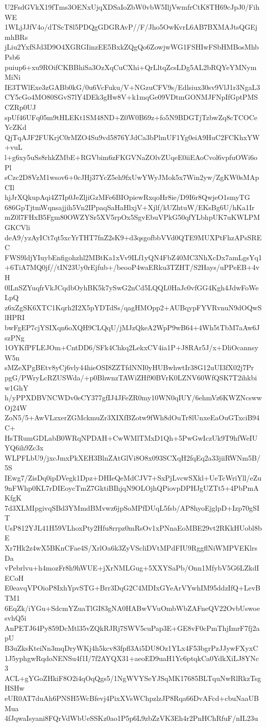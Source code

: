 U2FsdGVkX19fTms3OENxUjqXDSaIoZbW0vbW5IljVwmfrCtK8TH69cJpJ0/FihWE
1WLjJJfV4o/dTScT8l5PDQgGDGRAvP//F/Jho5OwKvrL6AB7BXMAJtsQGEjmhBRs
jLiu2YxfSJd3D9O4XGRGIinzEE5BxkZQgQo6ZowjwWG1FSHIwFSbHMBosMhbPsb6
puiup6+xu9ROifCKBBhiSa3OzXqCuCXhi+QrLltqZcsLDg5AL2bRQYeYMNymMiNi
IE3TWlExe3zGABb0kG/0u6VcFuku/V+NGzuCFV9s/Edlsiux30sv9VlJ1r3NgaL3
CY5cGo4MO80SGvS7lY4DEk3gHw8V+k1mqGe09VDtmGONMJFNpIfGptPMSCZRp0UJ
spUf46UFq05m9tHLEKt1SM48ND+Z0W0B69z+fo5N9BDGTjTzbwZq8cTCOCeYcZKd
QjTqAJF2FUKrjC0rMZO4Su9vd5876YJdCa3bPlmUF1Yg0eiA9HuC2FCKhxYW+vuL
l+g6xy5uSs8rhkZMbE+RGVbim6zFKGVNaZOlvZUqeE0iiEAoCvol6vpfuOWi6oPl
sCzc2D8VzM1wsov6+0cJHj37YcZ5eh9fxUwYWyJMok5x7Win2yw/ZgKW0sMApCIl
hjJrXQkupAqi4Z7Ip0JeZljiGzMFe6BIOpiewRxqoHr8ie/D9I6r8QwjeO1smyTG
686GpTjtmWqnsajjih5Vn2IPpaqSaHaHlxjV+Xjlf/kUZhtuW/EKsBg6U/hKa1Ir
mZ0l7FHxB5Fgm80OWZYSr5XV5rpOx5SgvEbuVPkG50qfYLbhpUK7uKWLPMGKCVli
deA9/yzAyICt7qt5xcYrTHT7fnZ2sK9+d3qsgofbbVVd0QTE9MUXPtFhzAPsSREC
FWS9ldjYIuybEnfigohzhl2MBtKa1xVv9ILf1yQN4FbZ40MC3NhXcDx7amLgsYq1
+6TiA7MQ0jf//tIN23Uy0rEjfub+/beooP4waERku3TZHT/S2Hays/uPPeEB+4vH
0lLnSZYuqfrVkJCqdbOyhBK5k7ySwG2nCd5LQQL0HaJc0vfGG4Kgh4JdwFoWeLpQ
z6xZgSK6XTC1Kqrh2I2X5pYDTdSs/qagHMOpp2+AUBqypFYVRvnuN9dOQwSlHPRI
bwFgEP7cjYSIXqn6oXQH9CLQqU/jMJzQkeA2WpP9wB64+4Wh5tTbM7aAw6JszPNg
1OYKfPFLEJOm+CntDD6/SFk4Chkq2LekxCV4ia1P+J8RAr5J/x+DliOcannsyW5n
sMZeXPgBEtv8yCj6vly44hieOSI8ZZTfdNNI0yHUBwhwtIr38G12uUI3fX02j7Pr
pgG/PWryLcRZUSWda/+p0BhwnzTAWiZHf90BVrK0LZNV60WfQSK7T2ihkbiw1GhY
h/yPPXDBVNCWDv0eCY377gfIJ4JFeZR0my10WN0qIUY/6ehmVz6KWZNcswwOj24W
ZoN5/5+AwVLzxerZGMckmuZr3XIXfBZotw9fWh8dOuTr8lUnxeEaOuGTxciB94C+
HsTRumGDLabB0WRqNPDAH+CwWMlTMxD1Qh+5PwGwIczUk9T9hfWeIUYQ6ih9Zc3x
WLPFLbU9/jxcJmxPkXEH3BlnZAtGlVi8O8x093SCXqH2fqEq2a33jiiRWNm5B/5S
IEwg7/ZisDq0ipDVegk1Dpz+DHIeQeMdCJV7+SxPjLvcwSXkl+UeTcWriYll/eZu
9nFWhp0KL7rDIEoycTmZ7GktiBIhjqN9OLOjhQPiovpDPHJgUZTt5+4PbPmAKfgK
7d3XLMIpgivqSBd3YMmdBMvwz6jpSoMPfDUqL5fsb/AP8hyoEjglpD+Izp70gSIT
UsP812YJL41H59VLhoxPty2Hfu8rrpz0mRsOv1xPNnaEoMBE29vt2RKkHUobl8bE
Xr7Hk2z4wX5BKnCFae4S/XrlOa6k3ZyVScliDVtMPdFIU9RggflNiWMPVEKlrsDa
vPebrlvu+h4mozFr8h9hWUE+jXrNMLGug+5XXYSaPb/Onn1MfybV5G6LZkdIECoH
E0eavqVPOioP8IxhYpvSTG+Brr3DqG2C4MDIxGYeArVYwhIM95ddzIfQ+LevBTM1
6EqZk/iYGu+SdcmYZuaTlGI83gNA0HABwVVuOmbWbZAFneQV22OvbUswoesvhQ5i
AnPETJ64Py859DcMtl35vZQkRJRj7SWV5cuPap3E+GE8vF0cPmThjImrF7fj2apU
B3uZksKteiNn3mqDryWKj4h5kcv83fpfl3Ai5DU8Oz1YLx4F53bgrPzJJywFXyxC
1J5yphgwRqdoNENSu4f1I/7f2AYQX31+aeoED9uaH1Yc6ptqkCa0YdkXiLJ8YNc3
ACL+gYGoZHkiF8O2i4qOqQgs5/1NgWVYSeYJSqMK17685BLTquNwRlRkzTsgHSHw
eUR0AT7duAh6PNSH5WcBfevj4PixXVsWChpzlzJP8Rqa66DvAFcd+cbuNaaUBMua
4fJqwaIsyani8FQrVdWbUeSSKz0ao1P5p6L9zbZzVK3Eh4r2PnHChRfuF/nIL23u
